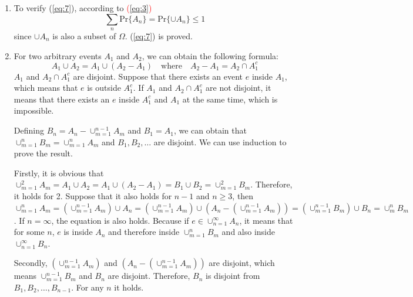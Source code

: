 \documentclass[UTF8]{article}
\begin{document}
\begin{enumerate}[1.]
        \begin{equation*}
            \text{Pr}\{A\}\leq\text{Pr}\{\Omega\}=1
        \end{equation*}
        (\ref{eq:6}) is proved
        \item To verify (\ref{eq:7}), according to \textcolor{red}{(\ref{eq:3})}
        \begin{equation*}
            \sum_n\text{Pr}\{A_n\}=\text{Pr}\{\cup A_n\}\leq1
        \end{equation*}
        since $\cup A_n$ is also a subset of $\Omega$. (\ref{eq:7}) is proved.
        \item For two arbitrary events $A_1$ and $A_2$, we can obtain the following formula:
        \begin{equation*}
            A_1\cup A_2=A_1\cup(A_2-A_1)\quad\text{where}\quad A_2-A_1=A_2\cap A^c_1
        \end{equation*}
        $A_1$ and $A_2\cap A^c_1$ are disjoint. Suppose that there exists an event $e$ inside $A_1$, which means that $e$ is outside $A^c_1$. If $A_1$ and $A_2\cap A^c_1$ are not disjoint, it means that there exists an $e$ inside $A^c_1$ and $A_1$ at the same time, which is impossible.

        Defining $B_n=A_n-\cup^{n-1}_{m=1}A_m$ and $B_1=A_1$, we can obtain that $\cup^n_{m=1}B_m=\cup^n_{m=1}A_m$ and $B_1,B_2,\dots$ are disjoint. We can use induction to prove the result. 
        
        Firstly, it is obvious that $\cup^2_{m=1}A_m=A_1\cup A_2=A_1\cup(A_2-A_1)=B_1\cup B_2=\cup^2_{m=1}B_m$. Therefore, it holds for 2. Suppose that it also holds for $n-1$ and $n\geq3$, then $\cup^n_{m=1}A_m=(\cup^{n-1}_{m=1}A_m)\cup A_n=(\cup^{n-1}_{m=1}A_m)\cup(A_n-(\cup^{n-1}_{m=1}A_m))=(\cup^{n-1}_{m=1}B_m)\cup B_n=\cup^n_mB_m$. If $n=\infty$, the equation is also holds. Because if $e\in\cup^\infty_{n=1}A_n$, it means that for some $n$, $e$ is inside $A_n$ and therefore inside $\cup^n_{m=1}B_m$ and also inside $\cup^\infty_{n=1}B_n$.

        Secondly, $(\cup^{n-1}_{m=1}A_m)$ and $(A_n-(\cup^{n-1}_{m=1}A_m))$ are disjoint, which means $\cup^{n-1}_{m=1}B_m$ and $B_n$ are disjoint. Therefore, $B_n$ is disjoint from $B_1,B_2,\dots,B_{n-1}$. For any $n$ it holds.


\end{enumerate}
\end{document}
